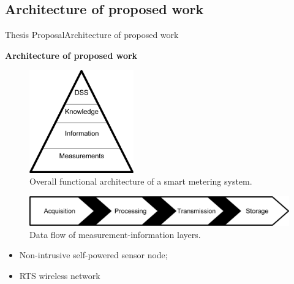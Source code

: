 \subsection{Architecture of proposed work}

\begin{frame}{Thesis Proposal}{Architecture of proposed work}
\begin{block}{\textbf{Architecture of proposed work}}
	
	\begin{minipage}[t]{0.48\linewidth}
		
		\vspace{2em}
		\begin{figure}[ht!]
			\centering
			\includegraphics[width=0.4\textwidth,keepaspectratio]{figures/40.Method/pyramid}
			\caption{Overall functional architecture of a smart metering system.}
		\end{figure}

	\end{minipage}\hfill
	\begin{minipage}[t]{0.48\linewidth}
		
		\vspace{2em}
		\begin{figure}[ht!]
			\centering

			\includegraphics[width=\textwidth,keepaspectratio]{figures/40.Method/data_flow}
			\caption{Data flow of measurement-information layers.}
		\end{figure}
	\hfill
	\vspace{-2em}
		\begin{itemize}
		\item  Non-intrusive self-powered sensor node;
		\item  RTS wireless network
	\end{itemize}
		
	
		
	\end{minipage}
	
\end{block}
\end{frame}

